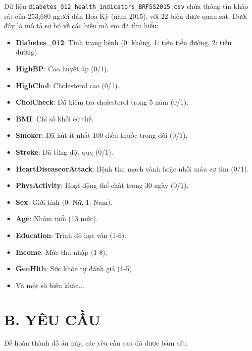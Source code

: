 \documentclass{article}
\begin{document}
Dữ liệu \texttt{diabetes\_012\_health\_indicators\_BRFSS2015.csv} chứa thông tin khảo sát của 253,680 người dân Hoa Kỳ (năm 2015), với 22 biến được quan sát. Dưới đây là mô tả sơ bộ về các biến mà em đã tìm hiểu:

\begin{itemize}
    \item \textbf{Diabetes\_012}: Tình trạng bệnh (0: không, 1: tiền tiểu đường, 2: tiểu đường).
    \item \textbf{HighBP}: Cao huyết áp (0/1).
    \item \textbf{HighChol}: Cholesterol cao (0/1).
    \item \textbf{CholCheck}: Đã kiểm tra cholesterol trong 5 năm (0/1).
    \item \textbf{BMI}: Chỉ số khối cơ thể.
    \item \textbf{Smoker}: Đã hút ít nhất 100 điếu thuốc trong đời (0/1).
    \item \textbf{Stroke}: Đã từng đột quỵ (0/1).
    \item \textbf{HeartDiseaseorAttack}: Bệnh tim mạch vành hoặc nhồi máu cơ tim (0/1).
    \item \textbf{PhysActivity}: Hoạt động thể chất trong 30 ngày (0/1).
    \item \textbf{Sex}: Giới tính (0: Nữ, 1: Nam).
    \item \textbf{Age}: Nhóm tuổi (13 mức).
    \item \textbf{Education}: Trình độ học vấn (1-6).
    \item \textbf{Income}: Mức thu nhập (1-8).
    \item \textbf{GenHlth}: Sức khỏe tự đánh giá (1-5).
    \item Và một số biến khác...
\end{itemize}

\newpage
\section{B. YÊU CẦU}

Để hoàn thành đồ án này, các yêu cầu sau đã được bám sát:
\end{document}
